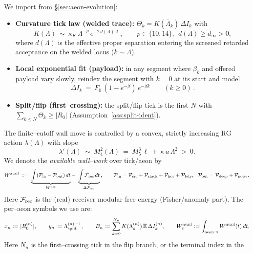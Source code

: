 \documentclass[10pt]{article}
\theoremstyle{definition}
\theoremstyle{plain}
\begin{document}
We import from \S\ref{sec:aeon-evolution}:
\begin{itemize}[leftmargin=1.15em,itemsep=2pt,topsep=2pt]
\item \textbf{Curvature tick law (welded trace):} $\Theta_k=K(\bar\Lambda_k)\,\Delta I_k$ with
\begin{equation}
K(\Lambda)\ \sim\ \kappa_K\,\Lambda^{-p}\,e^{-2\,d(\Lambda)\,\Lambda}\,,\qquad p\in\{10,14\},\ \ d(\Lambda)\ge d_\infty>0,
\label{eq:ads5-K}
\end{equation}
where $d(\Lambda)$ is the effective proper separation entering the screened retarded acceptance on the welded locus ($k\sim\Lambda$).
\item \textbf{Local exponential fit (payload):} in any segment where $\beta_k$ and offered payload vary slowly,
reindex the segment with $k=0$ at its start and model
\begin{equation}
\Delta I_k\ =\ F_0\,(1-e^{-\beta})\,e^{-\beta k}\qquad(k\ge 0)\,.
\label{eq:ads5-tail}
\end{equation}
\item \textbf{Split/flip (first--crossing):} the split/flip tick is the first $N$ with
$\sum_{k\le N}\Theta_k\ge |R_0|$ (Assumption~\ref{ass:split-ident}).
\end{itemize}
The finite--cutoff wall move is controlled by a convex, strictly increasing RG action $\lambda(\Lambda)$ with slope
\begin{equation}
\lambda'(\Lambda)\ \sim\ M_4^2(\Lambda)\ =\ M_5^3\,\ell\ +\ \kappa\,a\,\Lambda^2\ >\ 0.
\label{eq:ads5-lambda-prime}
\end{equation}
We denote the \emph{available wall--work} over tick/aeon by
\begin{equation}
W^{\rm avail}\ :=\ \underbrace{\int(\mathcal P_{\rm in}-\mathcal P_{\rm out})\,dt}_{W^{\rm net}}
-\ \underbrace{\int \dot{\mathcal F}_{\rm rec}\,dt}_{\Delta\mathcal F_{\rm rec}}\,,\qquad \mathcal P_{\rm in}=\mathcal P_{\rm src}+\mathcal P_{\rm stack}+\mathcal P_{\rm hor}+\mathcal P_{\rm bdy},\ \ \mathcal P_{\rm out}=\mathcal P_{\rm deep}+\mathcal P_{\rm noise}.
\label{eq:ads5-Wavail-def}
\end{equation}
Here $\mathcal F_{\rm rec}$ is the (real) receiver modular free energy (Fisher/anomaly part). The per--aeon symbols we use are:
\[
x_n:=|R^{(n)}_0|,\qquad y_n:=\Lambda^{(n)\,-1}_{\rm split},\qquad
B_n:=\sum_{k=0}^{N_n}K(\bar\Lambda_k^{(n)})\,\mathbb E\,\Delta I_k^{(n)},\qquad
W^{\rm avail}_n:=\int_{\text{aeon }n}W^{\rm avail}(t)\,dt,
\]
Here $N_n$ is the first--crossing tick in the flip branch, or the terminal index in the
\end{document}
